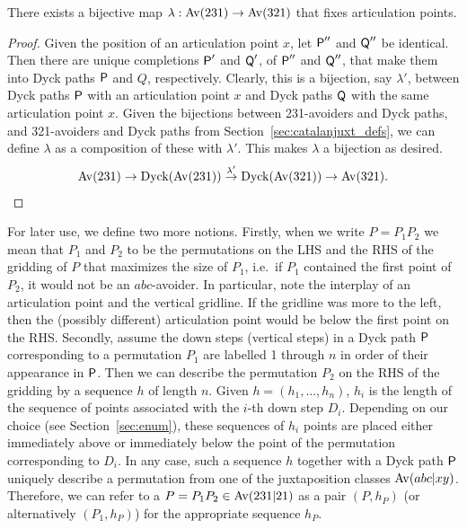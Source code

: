 \documentclass[12pt, a4paper, twoside]{report}
\begin{document}
\begin{lemma}
\label{lem:simplebijection}
There exists a bijective map $\lambda: \mathrm{Av}(231) \to \mathrm{Av}(321)$ that fixes articulation points.
\end{lemma}
\begin{proof}
Given the position of an articulation point $x$, let $\textsf{P}''$ and $\textsf{Q}''$ be identical. Then there are unique completions $\textsf{P}'$ and $\textsf{Q}'$, of $\textsf{P}''$ and $\textsf{Q}''$, that make them into Dyck paths $\textsf{P}$ and $Q$, respectively. Clearly, this is a bijection, say $\lambda'$, between Dyck paths $\textsf{P}$ with an articulation point $x$ and Dyck paths $\textsf{Q}$ with the same articulation point $x$. Given the bijections between 231-avoiders and Dyck paths, and 321-avoiders and Dyck paths from Section~\ref{sec:catalanjuxt_defs}, we can define $\lambda$ as a composition of these with $\lambda'$. This makes $\lambda$ a bijection as desired.
\begin{align*}
\mathrm{Av}(231) \to \text{Dyck}(\mathrm{Av}(231)) \overset{\lambda'}{\to} \text{Dyck}(\mathrm{Av}(321))\to \mathrm{Av}(321).
\end{align*}
\end{proof}

For later use, we define two more notions. Firstly, when we write $P = P_1P_2$ we mean that $P_1$ and $P_2$ to be the permutations on the LHS and the RHS of the gridding of $P$ that maximizes the size of $P_1$, i.e.~if $P_1$ contained the first point of $P_2$, it would not be an $abc$-avoider. In particular, note the interplay of an articulation point and the vertical gridline. If the gridline was more to the left, then the (possibly different) articulation point would be below the first point on the RHS. Secondly, assume the down steps (vertical steps) in a Dyck path $\textsf{P}$ corresponding to a permutation $P_1$ are labelled 1 through $n$ in order of their appearance in $\textsf{P}$. Then we can describe the permutation $P_2$ on the RHS of the gridding by a sequence $h$ of length $n$. Given $h = (h_1,\ldots,h_n)$, $h_i$ is the length of the sequence of points associated with the $i$-th down step $D_i$. Depending on our choice (see Section~\ref{sec:enum}), these sequences of $h_i$ points are placed either immediately above or immediately below the point of the permutation corresponding to $D_i$. In any case, such a sequence $h$ together with a Dyck path $\textsf{P}$ uniquely describe a permutation from one of the juxtaposition classes $\mathrm{Av}(abc|xy)$. Therefore, we can refer to a $P = P_1P_2 \in \mathrm{Av}(231|21)$ as a pair $(P,h_P)$ (or alternatively $(P_1,h_P)$) for the appropriate sequence $h_P$.
\end{document}
